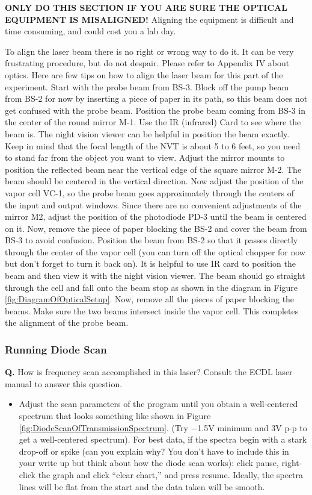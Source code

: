 \documentclass{../lab}
\begin{document}
\textbf{ONLY DO THIS SECTION IF YOU ARE SURE THE OPTICAL EQUIPMENT IS MISALIGNED!} Aligning the equipment is difficult and time consuming, and could cost you a lab day.

To align the laser beam there is no right or wrong way to do it. It can be very frustrating procedure, but do not despair. Please refer to Appendix IV about optics. Here are few tips on how to align the laser beam for this part of the experiment. Start with the probe beam from BS-3. Block off the pump beam from BS-2 for now by inserting a piece of paper in its path, so this beam does not get confused with the probe beam. Position the probe beam coming from BS-3 in the center of the round mirror M-1. Use the IR (infrared) Card to see where the beam is. The night vision viewer can be helpful in position the beam exactly. Keep in mind that the focal length of the NVT is about 5 to 6 feet, so you need to stand far from the object you want to view. Adjust the mirror mounts to position the reflected beam near the vertical edge of the square mirror M-2. The beam should be centered in the vertical direction. Now adjust the position of the vapor cell VC-1, so the probe beam goes approximately through the centers of the input and output windows. Since there are no convenient adjustments of the mirror M2, adjust the position of the photodiode PD-3 until the beam is centered on it. Now, remove the piece of paper blocking the BS-2 and cover the beam from BS-3 to avoid confusion. Position the beam from BS-2 so that it passes directly through the center of the vapor cell (you can turn off the optical chopper for now but don't forget to turn it back on). It is helpful to use IR card to position the beam and then view it with the night vision viewer. The beam should go straight through the cell and fall onto the beam stop as shown in the diagram in Figure \ref{fig:DiagramOfOpticalSetup}. Now, remove all the pieces of paper blocking the beams. Make sure the two beams intersect inside the vapor cell. This completes the alignment of the probe beam.

\subsubsection{Running Diode Scan}

\textbf{Q.} How is frequency scan accomplished in this laser? Consult the ECDL laser manual to answer this question.

\begin{itemize}
    \item Adjust the scan parameters of the program until you obtain a well-centered spectrum that looks something like shown in Figure \ref{fig:DiodeScanOfTransmissionSpectrum}. (Try $-$1.5V minimum and 3V p-p to get a well-centered spectrum). For best data, if the spectra begin with a stark drop-off or spike (can you explain why? You don't have to include this in your write up but think about how the diode scan works): click pause, right-click the graph and click ``clear chart,'' and press resume. Ideally, the spectra lines will be flat from the start and the data taken will be smooth.

\end{itemize}
\end{document}
